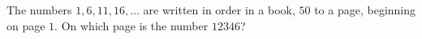 The numbers $1,6,11,16,\dots$ are written in order in a book, $50$ to a page, beginning on page $1$. On which page is the number $12346$?
